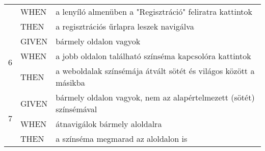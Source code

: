 \begin{center}
\begin{longtable}{ | m{}| m{} | m{} | }
		\cline{2-3}
		& WHEN & a lenyíló almenüben a "Regisztráció" feliratra kattintok \\
		\cline{2-3}
		& THEN & a regisztrációs űrlapra leszek navigálva \\
		\hline
		\multirow{3}{*}{6} & GIVEN & bármely oldalon vagyok \\
		\cline{2-3}
		& WHEN & a jobb oldalon található színséma kapcsolóra kattintok \\
		\cline{2-3}
		& THEN & a weboldalak színsémája átvált sötét és világos között a másikba \\
		\hline
		\multirow{3}{*}{7} & GIVEN & bármely oldalon vagyok, nem az alapértelmezett (sötét) színsémával \\
		\cline{2-3}
		& WHEN & átnavigálok bármely aloldalra \\
		\cline{2-3}
		& THEN & a színséma megmarad az aloldalon is \\
		\hline
	\end{longtable}
	\label{tab:sim_guest_navigation}
\end{center}

